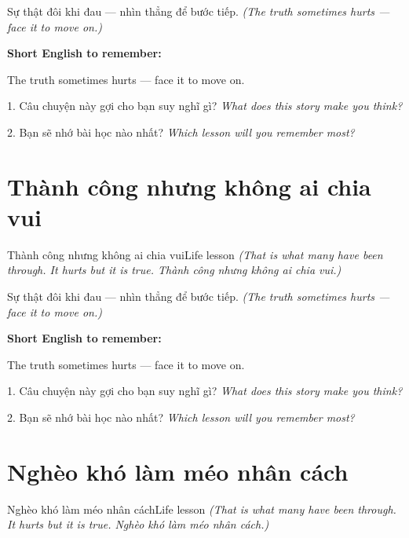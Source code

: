 \begin{baihoc}
Sự thật đôi khi đau — nhìn thẳng để bước tiếp.
\textit{(The truth sometimes hurts — face it to move on.)}
\end{baihoc}

\begin{ghinhoanh}
\textbf{Short English to remember:}

The truth sometimes hurts — face it to move on.

\end{ghinhoanh}

\begin{tuhocnhanh}
1. Câu chuyện này gợi cho bạn suy nghĩ gì? \textit{What does this story make you think?}

2. Bạn sẽ nhớ bài học nào nhất? \textit{Which lesson will you remember most?}
\end{tuhocnhanh}
\ngancach


\section{Thành công nhưng không ai chia vui}
\begin{truyen}{Thành công nhưng không ai chia vui}{Life lesson}
\textit{(That is what many have been through. It hurts but it is true. Thành công nhưng không ai chia vui.)}
\end{truyen}

\begin{baihoc}
Sự thật đôi khi đau — nhìn thẳng để bước tiếp.
\textit{(The truth sometimes hurts — face it to move on.)}
\end{baihoc}

\begin{ghinhoanh}
\textbf{Short English to remember:}

The truth sometimes hurts — face it to move on.

\end{ghinhoanh}

\begin{tuhocnhanh}
1. Câu chuyện này gợi cho bạn suy nghĩ gì? \textit{What does this story make you think?}

2. Bạn sẽ nhớ bài học nào nhất? \textit{Which lesson will you remember most?}
\end{tuhocnhanh}
\ngancach


\section{Nghèo khó làm méo nhân cách}
\begin{truyen}{Nghèo khó làm méo nhân cách}{Life lesson}
\textit{(That is what many have been through. It hurts but it is true. Nghèo khó làm méo nhân cách.)}
\end{truyen}

